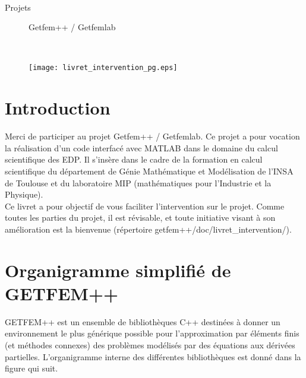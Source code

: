 \documentclass[12pt,a4paper]{../doc}
\begin{document}
$\;$\\[3cm]\thispagestyle{empty}

{\begin{center} \Huge Projets \\[1cm]

\begin{figure}[H]
\begin{center}
  { \sc Getfem++  / Getfemlab }
\end{center}
\end{figure}
$\;$\\[1cm]

\begin{figure}[H]
\begin{center}
\texttt{[image: livret\_intervention\_pg.eps]}
\end{center}
\end{figure}
\end{center}
 \newpage

\tableofcontents


\section{Introduction}
  Merci de participer au projet {\sc Getfem++ / Getfemlab}. Ce projet a pour vocation la r\'ealisation d'un code interfac\'e avec MATLAB dans le domaine du calcul scientifique des EDP. Il s'ins\`ere dans le cadre de la formation en calcul scientifique du d\'epartement de G\'enie Math\'ematique et Mod\'elisation de l'INSA de Toulouse et du laboratoire MIP (math\'ematiques pour l'Industrie et la Physique).\\[0.4cm]
Ce livret a pour objectif de vous faciliter l'intervention sur le projet. Comme toutes les parties du projet, il est r\'evisable, et toute initiative visant \`a son am\'elioration est la bienvenue (r\'epertoire getfem++/doc/livret\_intervention/).

\newpage

\section{Organigramme simplifi\'e de GETFEM++}
GETFEM++ est un ensemble de biblioth\`eques C++ destin\'ees \`a donner un environnement le plus g\'en\'erique possible pour l'approximation par \'el\'ements finis (et m\'ethodes connexes) des probl\`emes mod\'elis\'es par des \'equations aux d\'eriv\'ees partielles. L'organigramme interne des diff\'erentes biblioth\`eques est donn\'e dans la figure qui suit.

}
\end{document}
